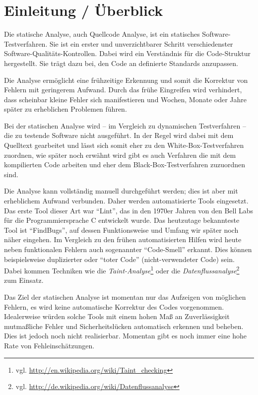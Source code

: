 \section{Einleitung / \"Uberblick}
Die statische Analyse, auch Quellcode Analyse, ist ein statisches Software-Testverfahren. Sie ist ein erster und unverzichtbarer Schritt verschiedenster Software-Qualitäts-Kontrollen. Dabei wird ein Verständnis für die Code-Struktur hergestellt. Sie trägt dazu bei, den Code an definierte Standards anzupassen.

Die Analyse ermöglicht eine frühzeitige Erkennung und somit die Korrektur von Fehlern mit geringerem Aufwand. Durch das frühe Eingreifen wird verhindert, dass scheinbar kleine Fehler sich manifestieren und Wochen, Monate oder Jahre später zu erheblichen Problemen führen.

Bei der statischen Analyse wird -- im Vergleich zu dynamischen Testverfahren -- die zu testende Software nicht ausgeführt. In der Regel wird dabei mit dem Quelltext gearbeitet und lässt sich somit eher zu den White-Box-Testverfahren zuordnen, wie später noch erwähnt wird gibt es auch Verfahren die mit dem kompilierten Code arbeiten und eher dem Black-Box-Testverfahren zuzuordnen sind.

Die Analyse kann vollständig manuell durchgeführt werden; dies ist aber mit erheblichem Aufwand verbunden. Daher werden automatisierte Tools eingesetzt. Das erste Tool dieser Art war ``Lint'', das in den 1970er Jahren von den Bell Labs für die Programmiersprache C entwickelt wurde. Das heutzutage bekannteste Tool ist ``FindBugs'', auf dessen Funktionsweise und Umfang wir später noch näher eingehen. Im Vergleich zu den frühen automatisierten Hilfen wird heute neben funktionalen Fehlern auch sogenannter ``Code-Smell'' erkannt. Dies können beispielsweise duplizierter oder ``toter Code'' (nicht-verwendeter Code) sein. Dabei kommen Techniken wie die \emph{Taint-Analyse}\footnote{vgl. \url{http://en.wikipedia.org/wiki/Taint_checking}} oder die \emph{Datenflussanalyse}\footnote{vgl. \url{http://de.wikipedia.org/wiki/Datenflussanalyse}} zum Einsatz. 

Das Ziel der statischen Analyse ist momentan nur das Aufzeigen von möglichen Fehlern, es wird keine automatische Korrektur des Codes vorgenommen. Idealerweise würden solche Tools mit einem hohen Maß an Zuverlässigkeit mutmaßliche Fehler und Sicherheitslücken automatisch erkennen und beheben. Dies ist jedoch noch nicht realisierbar. Momentan gibt es noch immer eine hohe Rate von Fehleinschätzungen.

